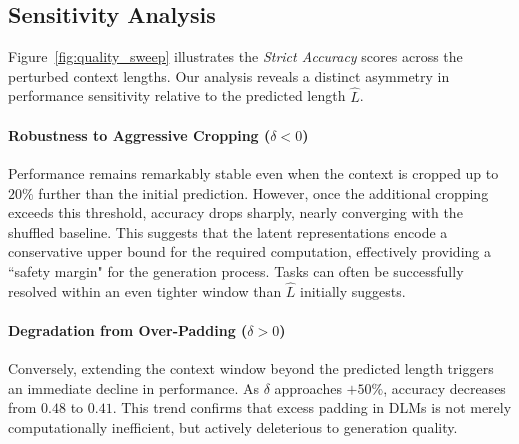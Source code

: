 \documentclass{article}
\theoremstyle{plain}
\theoremstyle{definition}
\theoremstyle{remark}
\begin{document}


\subsection{Sensitivity Analysis}
\label{sec:sensitivity}

Figure~\ref{fig:quality_sweep} illustrates the \textit{Strict Accuracy} scores across the perturbed context lengths. Our analysis reveals a distinct asymmetry in performance sensitivity relative to the predicted length $\hat{L}$.

\paragraph{Robustness to Aggressive Cropping ($\delta < 0$)} Performance remains remarkably stable even when the context is cropped up to $20\%$ further than the initial prediction. However, once the additional cropping exceeds this threshold, accuracy drops sharply, nearly converging with the shuffled baseline. This suggests that the latent representations encode a conservative upper bound for the required computation, effectively providing a ``safety margin" for the generation process. Tasks can often be successfully resolved within an even tighter window than $\hat{L}$ initially suggests.
    
\paragraph{Degradation from Over-Padding ($\delta > 0$)} Conversely, extending the context window beyond the predicted length triggers an immediate decline in performance. As $\delta$ approaches $+50\%$, accuracy decreases from $0.48$ to $0.41$. This trend confirms that excess padding in DLMs is not merely computationally inefficient, but actively deleterious to generation quality.
    
\end{document}
